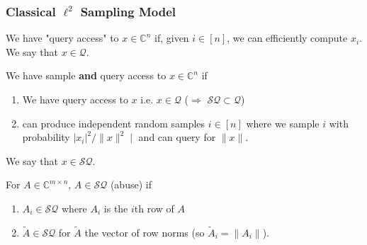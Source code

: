 \documentclass{beamer}
\newcommand\0{\mathbf{0}}
\newcommand\CC{\mathbb{C}}
\newcommand\<{\langle}
\renewcommand\>{\rangle}
\renewcommand\implies{\Rightarrow}
\begin{document}

\begin{frame}
\frametitle{Classical $\ell^2$ Sampling Model}
\begin{definition}
We have "query access" to $x \in \CC^n$ if, given $i \in [n]$, we can efficiently compute $x_i$. We say that $x \in \mathcal{Q}$.
\end{definition}
\begin{definition} We have sample \textbf{and} query access to $x \in \CC^n$ if 

\begin{enumerate}
\item We have query access to $x$ i.e. $x\in \mathcal{Q}$ ($\implies$ $\mathcal{SQ} \subset \mathcal{Q}$)
\item can produce independent random samples $i \in [n]$ where we sample $i$ with probability $|x_i|^2/\|x\|^2∣$ and can query for $\|x\|$.
\end{enumerate}
We say that $x \in \mathcal{SQ}$. 
\end{definition}
\begin{definition} For $A \in \CC^{m\times n}$, $A \in \mathcal{SQ}$ (abuse) if

\begin{enumerate}
\item $A_i \in \mathcal{SQ}$ where $A_i$ is the $i$th row of $A$
\item $\tilde{A} \in \mathcal{SQ}$ for $\tilde{A}$ the vector of row norms (so $\tilde{A}_i = \|A_i\|$).	
\end{enumerate}
 
\end{definition}
\end{frame}
\end{document}
